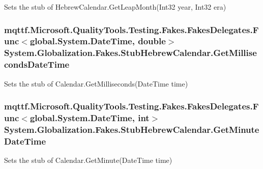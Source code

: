 Sets the stub of Hebrew\-Calendar.\-Get\-Leap\-Month(\-Int32 year, Int32 era)

\hypertarget{class_system_1_1_globalization_1_1_fakes_1_1_stub_hebrew_calendar_a46154807860844c47080516c2d799097}{
\subsubsection[{Get\-Milliseconds\-Date\-Time}]{\setlength{\rightskip}{0pt plus 5cm}mqttf.\-Microsoft.\-Quality\-Tools.\-Testing.\-Fakes.\-Fakes\-Delegates.\-Func$<$global.\-System.\-Date\-Time, double$>$ System.\-Globalization.\-Fakes.\-Stub\-Hebrew\-Calendar.\-Get\-Milliseconds\-Date\-Time}}\label{class_system_1_1_globalization_1_1_fakes_1_1_stub_hebrew_calendar_a46154807860844c47080516c2d799097}


Sets the stub of Calendar.\-Get\-Milliseconds(\-Date\-Time time)

\hypertarget{class_system_1_1_globalization_1_1_fakes_1_1_stub_hebrew_calendar_a7c510fa318acc94945cde12f30c2c582}{
\subsubsection[{Get\-Minute\-Date\-Time}]{\setlength{\rightskip}{0pt plus 5cm}mqttf.\-Microsoft.\-Quality\-Tools.\-Testing.\-Fakes.\-Fakes\-Delegates.\-Func$<$global.\-System.\-Date\-Time, int$>$ System.\-Globalization.\-Fakes.\-Stub\-Hebrew\-Calendar.\-Get\-Minute\-Date\-Time}}\label{class_system_1_1_globalization_1_1_fakes_1_1_stub_hebrew_calendar_a7c510fa318acc94945cde12f30c2c582}


Sets the stub of Calendar.\-Get\-Minute(\-Date\-Time time)


